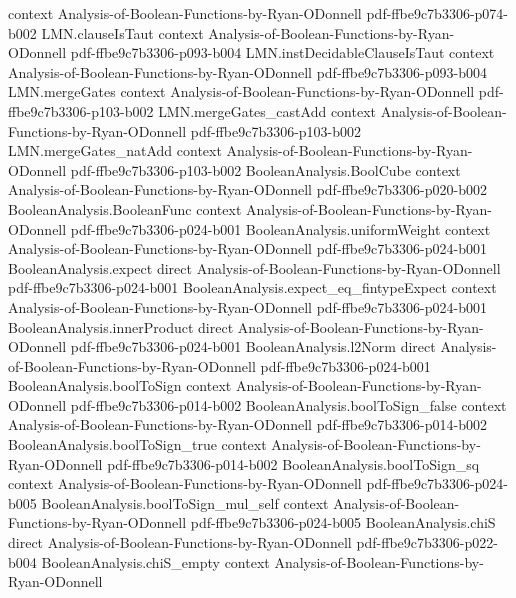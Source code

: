 \begin{theorem}
  {context}
  {Analysis-of-Boolean-Functions-by-Ryan-ODonnell}
  {pdf-ffbe9c7b3306-p074-b002}
\proofstep
  {LMN.clauseIsTaut}
  {context}
  {Analysis-of-Boolean-Functions-by-Ryan-ODonnell}
  {pdf-ffbe9c7b3306-p093-b004}
\proofstep
  {LMN.instDecidableClauseIsTaut}
  {context}
  {Analysis-of-Boolean-Functions-by-Ryan-ODonnell}
  {pdf-ffbe9c7b3306-p093-b004}
\proofstep
  {LMN.mergeGates}
  {context}
  {Analysis-of-Boolean-Functions-by-Ryan-ODonnell}
  {pdf-ffbe9c7b3306-p103-b002}
\proofstep
  {LMN.mergeGates_castAdd}
  {context}
  {Analysis-of-Boolean-Functions-by-Ryan-ODonnell}
  {pdf-ffbe9c7b3306-p103-b002}
\proofstep
  {LMN.mergeGates_natAdd}
  {context}
  {Analysis-of-Boolean-Functions-by-Ryan-ODonnell}
  {pdf-ffbe9c7b3306-p103-b002}
\proofstep
  {BooleanAnalysis.BoolCube}
  {context}
  {Analysis-of-Boolean-Functions-by-Ryan-ODonnell}
  {pdf-ffbe9c7b3306-p020-b002}
\proofstep
  {BooleanAnalysis.BooleanFunc}
  {context}
  {Analysis-of-Boolean-Functions-by-Ryan-ODonnell}
  {pdf-ffbe9c7b3306-p024-b001}
\proofstep
  {BooleanAnalysis.uniformWeight}
  {context}
  {Analysis-of-Boolean-Functions-by-Ryan-ODonnell}
  {pdf-ffbe9c7b3306-p024-b001}
\proofstep
  {BooleanAnalysis.expect}
  {direct}
  {Analysis-of-Boolean-Functions-by-Ryan-ODonnell}
  {pdf-ffbe9c7b3306-p024-b001}
\proofstep
  {BooleanAnalysis.expect_eq_fintypeExpect}
  {context}
  {Analysis-of-Boolean-Functions-by-Ryan-ODonnell}
  {pdf-ffbe9c7b3306-p024-b001}
\proofstep
  {BooleanAnalysis.innerProduct}
  {direct}
  {Analysis-of-Boolean-Functions-by-Ryan-ODonnell}
  {pdf-ffbe9c7b3306-p024-b001}
\proofstep
  {BooleanAnalysis.l2Norm}
  {direct}
  {Analysis-of-Boolean-Functions-by-Ryan-ODonnell}
  {pdf-ffbe9c7b3306-p024-b001}
\proofstep
  {BooleanAnalysis.boolToSign}
  {context}
  {Analysis-of-Boolean-Functions-by-Ryan-ODonnell}
  {pdf-ffbe9c7b3306-p014-b002}
\proofstep
  {BooleanAnalysis.boolToSign_false}
  {context}
  {Analysis-of-Boolean-Functions-by-Ryan-ODonnell}
  {pdf-ffbe9c7b3306-p014-b002}
\proofstep
  {BooleanAnalysis.boolToSign_true}
  {context}
  {Analysis-of-Boolean-Functions-by-Ryan-ODonnell}
  {pdf-ffbe9c7b3306-p014-b002}
\proofstep
  {BooleanAnalysis.boolToSign_sq}
  {context}
  {Analysis-of-Boolean-Functions-by-Ryan-ODonnell}
  {pdf-ffbe9c7b3306-p024-b005}
\proofstep
  {BooleanAnalysis.boolToSign_mul_self}
  {context}
  {Analysis-of-Boolean-Functions-by-Ryan-ODonnell}
  {pdf-ffbe9c7b3306-p024-b005}
\proofstep
  {BooleanAnalysis.chiS}
  {direct}
  {Analysis-of-Boolean-Functions-by-Ryan-ODonnell}
  {pdf-ffbe9c7b3306-p022-b004}
\proofstep
  {BooleanAnalysis.chiS_empty}
  {context}
  {Analysis-of-Boolean-Functions-by-Ryan-ODonnell}

\end{theorem}
